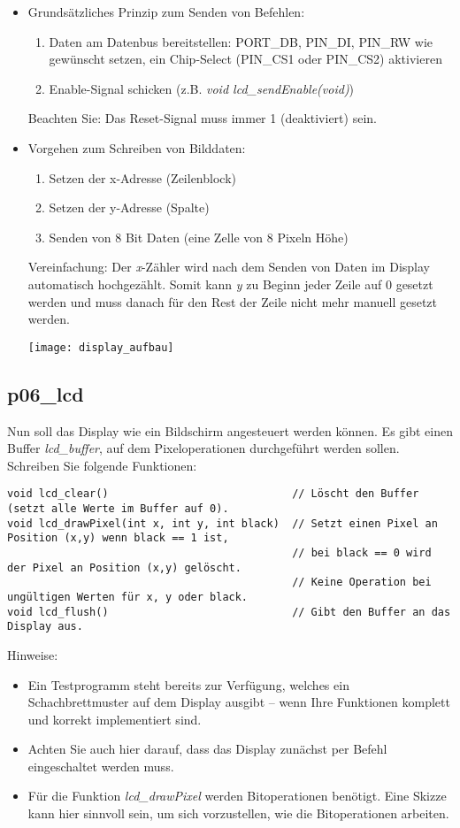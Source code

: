 \documentclass[
  accentcolor=tud1c,	%
  colorbacktitle,		%
  inverttitle,			%
  german,				%
  twoside
]{tudexercise}
\begin{document}
\begin{itemize}
\item Grundsätzliches Prinzip zum Senden von Befehlen:\begin{enumerate}
\item Daten am Datenbus bereitstellen: PORT\_DB, PIN\_DI, PIN\_RW wie gewünscht setzen, ein Chip-Select (PIN\_CS1 oder PIN\_CS2) aktivieren
\item Enable-Signal schicken (z.B. \textit{void lcd\_sendEnable(void)})
\end{enumerate}
Beachten Sie: Das Reset-Signal muss immer 1 (deaktiviert) sein.

\item Vorgehen zum Schreiben von Bilddaten:\begin{enumerate}
\item Setzen der x-Adresse (Zeilenblock)
\item Setzen der y-Adresse (Spalte)
\item Senden von 8 Bit Daten (eine \glqq{}Zelle\grqq{} von 8 Pixeln Höhe)
\end{enumerate}
Vereinfachung: Der \textit{x}-Zähler wird nach dem Senden von Daten im Display automatisch hochgezählt.
Somit kann \textit{y} zu Beginn jeder Zeile auf 0 gesetzt werden und muss danach für den Rest der Zeile nicht mehr manuell gesetzt werden.

\begin{center}\texttt{[image: display\_aufbau]}\end{center}


\end{itemize}

\subsection{p06\_lcd}
Nun soll das Display wie ein Bildschirm angesteuert werden können. Es gibt einen Buffer \textit{lcd\_buffer}, auf dem Pixeloperationen durchgeführt werden sollen. Schreiben Sie folgende Funktionen:
\begin{lstlisting}
void lcd_clear()                             // Löscht den Buffer (setzt alle Werte im Buffer auf 0).
void lcd_drawPixel(int x, int y, int black)  // Setzt einen Pixel an Position (x,y) wenn black == 1 ist,
                                             // bei black == 0 wird der Pixel an Position (x,y) gelöscht.
                                             // Keine Operation bei ungültigen Werten für x, y oder black.
void lcd_flush()                             // Gibt den Buffer an das Display aus.
\end{lstlisting}
Hinweise:
\begin{itemize}
\item Ein Testprogramm steht bereits zur Verfügung, welches ein Schachbrettmuster auf dem Display ausgibt -- wenn Ihre Funktionen komplett und korrekt implementiert sind.
\item Achten Sie auch hier darauf, dass das Display zunächst per Befehl eingeschaltet werden muss.
\item Für die Funktion \textit{lcd\_drawPixel} werden Bitoperationen benötigt. Eine Skizze kann hier sinnvoll sein, um sich vorzustellen, wie die Bitoperationen arbeiten.
\end{itemize}
\end{document}
